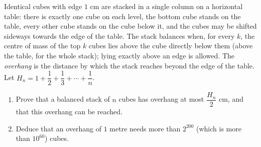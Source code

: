 Identical cubes with edge $1$ cm are stacked in a single column on a horizontal table: there is exactly one cube on each level, the bottom cube stands on the table, every other cube stands on the cube below it, and the cubes may be shifted sideways towards the edge of the table. The stack balances when, for every $k$, the centre of mass of the top $k$ cubes lies above the cube directly below them (above the table, for the whole stack); lying exactly above an edge is allowed. The \emph{overhang} is the distance by which the stack reaches beyond the edge of the table. Let $H_n=1+\dfrac12+\dfrac13+\cdots+\dfrac1n$.
\begin{enumerate}
\item[(a)] Prove that a balanced stack of $n$ cubes has overhang at most $\dfrac{H_n}{2}$ cm, and that this overhang can be reached.
\item[(b)] Deduce that an overhang of $1$ metre needs more than $2^{200}$ (which is more than $10^{60}$) cubes.
\end{enumerate}
